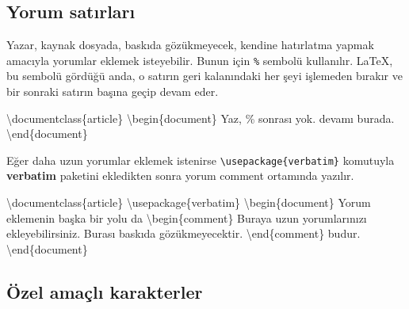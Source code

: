 \documentclass[
  letterpaper,
  DIV=11,
  numbers=noendperiod]{scrreprt}
\newenvironment{Shaded}{\begin{snugshade}}{\end{snugshade}}
\newcommand{\BuiltInTok}[1]{\textcolor[rgb]{0.00,0.23,0.31}{#1}}
\newcommand{\CommentTok}[1]{\textcolor[rgb]{0.37,0.37,0.37}{#1}}
\newcommand{\ExtensionTok}[1]{\textcolor[rgb]{0.00,0.23,0.31}{#1}}
\newcommand{\KeywordTok}[1]{\textcolor[rgb]{0.00,0.23,0.31}{#1}}
\newcommand{\NormalTok}[1]{\textcolor[rgb]{0.00,0.23,0.31}{#1}}
\begin{document}
\hypertarget{yorum-satux131rlarux131}{%
\subsection{Yorum satırları}\label{yorum-satux131rlarux131}}

Yazar, kaynak dosyada, baskıda gözükmeyecek, kendine hatırlatma yapmak
amacıyla yorumlar eklemek isteyebilir. Bunun için \texttt{\%} sembolü
kullanılır. {\LaTeX}, bu sembolü gördüğü anda, o satırın geri
kalanındaki her şeyi işlemeden bırakır ve bir sonraki satırın başına
geçip devam eder.

\begin{Shaded}
\begin{Highlighting}[]
\BuiltInTok{\textbackslash{}documentclass}\NormalTok{\{}\ExtensionTok{article}\NormalTok{\}}
 \KeywordTok{\textbackslash{}begin}\NormalTok{\{}\ExtensionTok{document}\NormalTok{\}}
\NormalTok{  Yaz, }\CommentTok{\% sonrası yok.}
\NormalTok{  devamı burada.}
 \KeywordTok{\textbackslash{}end}\NormalTok{\{}\ExtensionTok{document}\NormalTok{\}}
\end{Highlighting}
\end{Shaded}

Eğer daha uzun yorumlar eklemek istenirse
\texttt{\textbackslash{}usepackage\{verbatim\}} komutuyla
\textbf{verbatim} paketini ekledikten sonra yorum comment ortamında
yazılır.

\begin{Shaded}
\begin{Highlighting}[]
\BuiltInTok{\textbackslash{}documentclass}\NormalTok{\{}\ExtensionTok{article}\NormalTok{\}}
\BuiltInTok{\textbackslash{}usepackage}\NormalTok{\{}\ExtensionTok{verbatim}\NormalTok{\}}
 \KeywordTok{\textbackslash{}begin}\NormalTok{\{}\ExtensionTok{document}\NormalTok{\}}
\NormalTok{  Yorum eklemenin başka bir yolu da}
    \KeywordTok{\textbackslash{}begin}\NormalTok{\{}\ExtensionTok{comment}\NormalTok{\}}
\CommentTok{        Buraya uzun yorumlarınızı}
\CommentTok{        ekleyebilirsiniz. Burası}
\CommentTok{        baskıda gözükmeyecektir.}
\CommentTok{    }\KeywordTok{\textbackslash{}end}\NormalTok{\{}\ExtensionTok{comment}\NormalTok{\}}
\NormalTok{ budur.}
 \KeywordTok{\textbackslash{}end}\NormalTok{\{}\ExtensionTok{document}\NormalTok{\}}
\end{Highlighting}
\end{Shaded}

\hypertarget{uxf6zel-amauxe7lux131-karakterler}{%
\subsection{Özel amaçlı
karakterler}\label{uxf6zel-amauxe7lux131-karakterler}}
\end{document}
